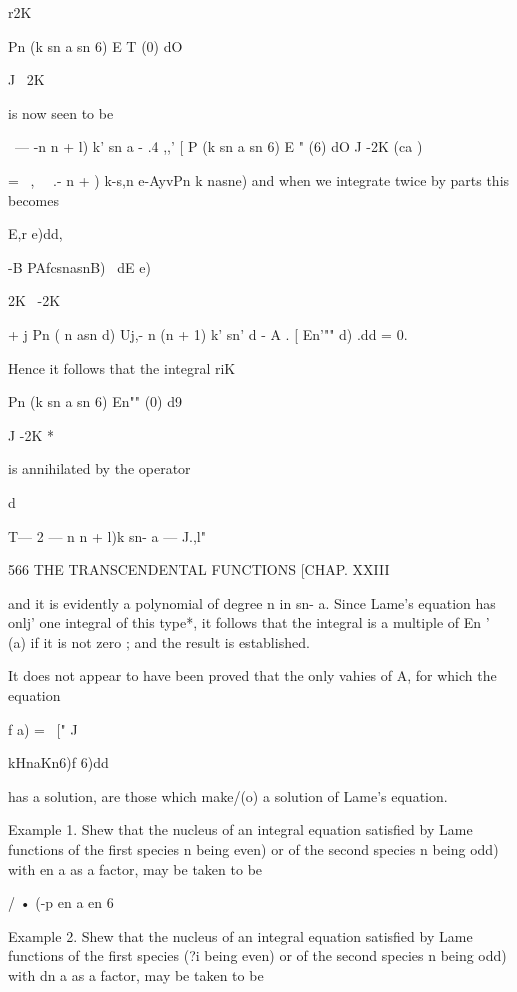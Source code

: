 {{{{{{{r2K 

Pn (k sn a sn 6) E T (0) dO 

J ~2K 

is now seen to be 

\ — -n n + l) k' sn  a - .4 ,,'  [ P  (k sn a sn 6) E "  (6) dO 
J -2K (ca ) 



= \  , \ \  .-  n +  ) k-s,n e-AyvPn k nasne) 
and when we integrate twice by parts this becomes 



E,r e)dd, 



-B PAfcsnasnB)     \           dE e) 



2K 
\ -2K 



+ j Pn ( n asn d) Uj,- n (n + 1) k' sn' d - A .  [ En'""  d) .dd = 0. 

Hence it follows that the integral 
riK 

Pn (k sn a sn 6) En"" (0) d9 

J -2K * 

is annihilated by the operator 

d  

T— 2 — n  n + l)k  sn- a — J.,l"  



566 THE TRANSCENDENTAL FUNCTIONS [CHAP. XXIII 

and it is evidently a polynomial of degree n in sn- a. Since Lame's equation 
has onlj'  one integral of this type*, it follows that the integral is a multiple 
of En '  (a) if it is not zero ; and the result is established. 

It does not appear to have been proved that the only vahies of A, for which the equation 

f a) = \ ["  J\ \ {kHnaKn6)f 6)dd 

has a solution, are those which make/(o) a solution of Lame's equation. 

Example 1. Shew that the nucleus of an integral equation satisfied by Lame functions 
of the first species  n being even) or of the second species  n being odd) with en a as a 
factor, may be taken to be 

/ •  (-p en a en 6 

Example 2. Shew that the nucleus of an integral equation satisfied by Lame functions 
of the first species (?i being even) or of the second species  n being odd) with dn a as a 
factor, may be taken to be 

}}}}}}}}
